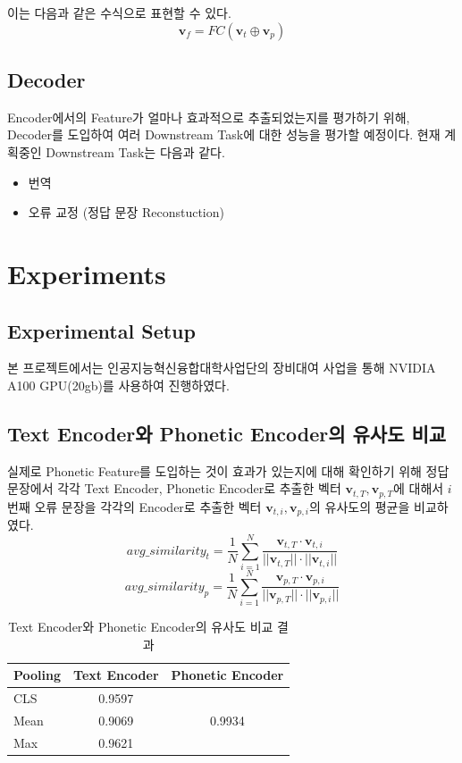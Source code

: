 \documentclass[letterpaper]{article} %
\begin{document}
이는 다음과 같은 수식으로 표현할 수 있다.
\begin{equation}
    \mathbf{v}_f = FC (\mathbf{v}_t \oplus \mathbf{v}_p)
\end{equation}

\subsection{Decoder}
Encoder에서의 Feature가 얼마나 효과적으로 추출되었는지를 평가하기 위해, Decoder를 도입하여 여러 Downstream Task에 대한 성능을 평가할 예정이다.
현재 계획중인 Downstream Task는 다음과 같다.
\begin{itemize}
    \item 번역
    \item 오류 교정 (정답 문장 Reconstuction)
\end{itemize}

\section{Experiments}
\subsection{Experimental Setup}
본 프로젝트에서는 인공지능혁신융합대학사업단의 장비대여 사업을 통해 NVIDIA A100 GPU(20gb)를 사용하여 진행하였다.

\subsection{Text Encoder와 Phonetic Encoder의 유사도 비교}
실제로 Phonetic Feature를 도입하는 것이 효과가 있는지에 대해 확인하기 위해 정답 문장에서 각각 Text Encoder, Phonetic Encoder로 추출한 벡터 $\mathbf{v}_{t,T}, \mathbf{v}_{p,T}$에 대해서 $i$번째 오류 문장을 각각의 Encoder로 추출한 벡터 $\mathbf{v}_{t,i}, \mathbf{v}_{p,i}$의 유사도의 평균을 비교하였다.
\begin{equation}
    avg\_similarity_{t} = \frac{1}{N} \sum_{i=1}^{N} \frac{\mathbf{v}_{t,T} \cdot \mathbf{v}_{t,i}}{||\mathbf{v}_{t,T}|| \cdot ||\mathbf{v}_{t,i}||}
\end{equation}
\begin{equation}
    avg\_similarity_{p} = \frac{1}{N} \sum_{i=1}^{N} \frac{\mathbf{v}_{p,T} \cdot \mathbf{v}_{p,i}}{||\mathbf{v}_{p,T}|| \cdot ||\mathbf{v}_{p,i}||}
\end{equation}
\begin{table}[ht]
    \centering
    \begin{tabular}{lcc}
    Pooling & \multicolumn{1}{l}{Text Encoder} & \multicolumn{1}{l}{Phonetic Encoder} \\ \hline
    CLS     & 0.9597                           &                                      \\
    Mean    & 0.9069                           & 0.9934                               \\
    Max     & 0.9621                           &                                     
    \end{tabular}
    \caption{Text Encoder와 Phonetic Encoder의 유사도 비교 결과}
    \label{tab:encoder_comparison}
\end{table}
\end{document}

